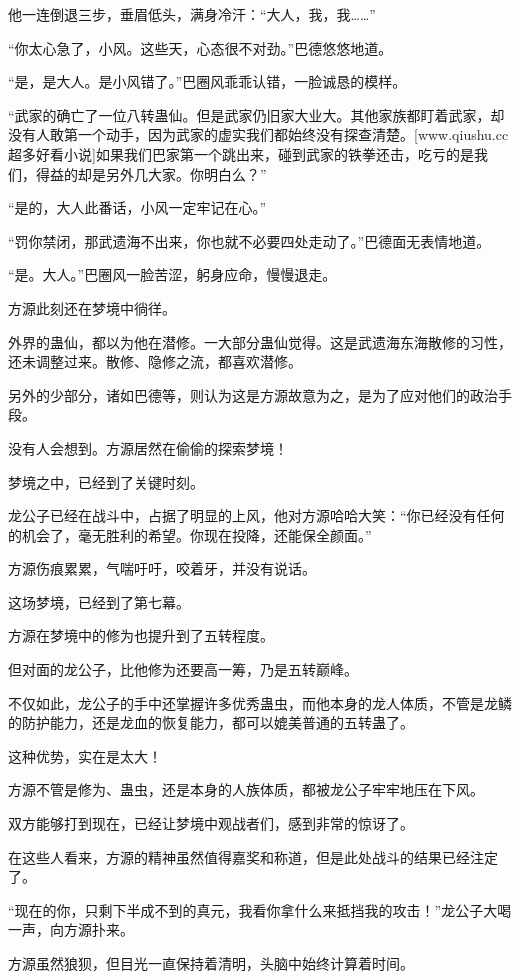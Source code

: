 \begin{this_body}
他一连倒退三步，垂眉低头，满身冷汗：“大人，我，我……”

“你太心急了，小风。这些天，心态很不对劲。”巴德悠悠地道。

“是，是大人。是小风错了。”巴圈风乖乖认错，一脸诚恳的模样。

“武家的确亡了一位八转蛊仙。但是武家仍旧家大业大。其他家族都盯着武家，却没有人敢第一个动手，因为武家的虚实我们都始终没有探查清楚。[www.qiushu.cc 超多好看小说]如果我们巴家第一个跳出来，碰到武家的铁拳还击，吃亏的是我们，得益的却是另外几大家。你明白么？”

“是的，大人此番话，小风一定牢记在心。”

“罚你禁闭，那武遗海不出来，你也就不必要四处走动了。”巴德面无表情地道。

“是。大人。”巴圈风一脸苦涩，躬身应命，慢慢退走。

方源此刻还在梦境中徜徉。

外界的蛊仙，都以为他在潜修。一大部分蛊仙觉得。这是武遗海东海散修的习性，还未调整过来。散修、隐修之流，都喜欢潜修。

另外的少部分，诸如巴德等，则认为这是方源故意为之，是为了应对他们的政治手段。

没有人会想到。方源居然在偷偷的探索梦境！

梦境之中，已经到了关键时刻。

龙公子已经在战斗中，占据了明显的上风，他对方源哈哈大笑：“你已经没有任何的机会了，毫无胜利的希望。你现在投降，还能保全颜面。”

方源伤痕累累，气喘吁吁，咬着牙，并没有说话。

这场梦境，已经到了第七幕。

方源在梦境中的修为也提升到了五转程度。

但对面的龙公子，比他修为还要高一筹，乃是五转巅峰。

不仅如此，龙公子的手中还掌握许多优秀蛊虫，而他本身的龙人体质，不管是龙鳞的防护能力，还是龙血的恢复能力，都可以媲美普通的五转蛊了。

这种优势，实在是太大！

方源不管是修为、蛊虫，还是本身的人族体质，都被龙公子牢牢地压在下风。

双方能够打到现在，已经让梦境中观战者们，感到非常的惊讶了。

在这些人看来，方源的精神虽然值得嘉奖和称道，但是此处战斗的结果已经注定了。

“现在的你，只剩下半成不到的真元，我看你拿什么来抵挡我的攻击！”龙公子大喝一声，向方源扑来。

方源虽然狼狈，但目光一直保持着清明，头脑中始终计算着时间。


\end{this_body}
